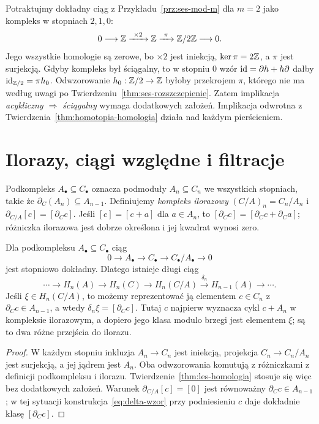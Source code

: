 \begin{przyklad}
\label{prz:acykliczny-niesciagalny}
Potraktujmy dokładny ciąg z
Przykładu~\ref{prz:ses-mod-m} dla $m=2$
jako kompleks w stopniach $2,1,0$:
\[
 0\longrightarrow\Z\xrightarrow{\ \times2\ }\Z
 \xrightarrow{\ \pi\ }\Z/2\Z\longrightarrow0.
\]
Jego wszystkie homologie są zerowe,
bo $\times2$ jest iniekcją,
$\ker\pi=2\mathbb{Z}$, a $\pi$ jest
surjekcją. Gdyby kompleks był
ściągalny, to w stopniu $0$
wzór $\mathrm{id}=\partial h+h\partial$ dałby
$\mathrm{id}_{\mathbb{Z}/2}=\pi h_0$.
Odwzorowanie $h_0:\mathbb{Z}/2\to\mathbb{Z}$ byłoby
przekrojem $\pi$, którego
nie ma według uwagi po
Twierdzeniu~\ref{thm:ses-rozszczepienie}.
Zatem implikacja \emph{acykliczny
$\Rightarrow$ ściągalny} wymaga
dodatkowych założeń. Implikacja
odwrotna z
Twierdzenia~\ref{thm:homotopia-homologia}
działa nad każdym pierścieniem.
\end{przyklad}

\section{Ilorazy, ciągi względne i filtracje}
\label{sec:iloraz-filtracja}

Podkompleks $A_\bullet\subseteq C_\bullet$
oznacza podmoduły $A_n\subseteq C_n$
we wszystkich stopniach, takie że
$\partial_C(A_n)\subseteq A_{n-1}$.
Definiujemy \emph{kompleks ilorazowy}
$(C/A)_n=C_n/A_n$ i
$\partial_{C/A}[c]=[\partial_Cc]$.
Jeśli $[c]=[c+a]$ dla $a\in A_n$,
to $[\partial_Cc]=[\partial_Cc+\partial_Ca]$;
różniczka ilorazowa jest dobrze
określona i jej kwadrat wynosi zero.

\begin{stwierdzenie}
\label{prop:ses-iloraz}
Dla podkompleksu $A_\bullet\subseteq C_\bullet$
ciąg
\[
 0\longrightarrow A_\bullet
 \longrightarrow C_\bullet
 \longrightarrow C_\bullet/A_\bullet
 \longrightarrow0
\]
jest stopniowo dokładny. Dlatego istnieje
długi ciąg
\begin{equation}\label{eq:les-iloraz}
 \cdots\to H_n(A)\to H_n(C)\to H_n(C/A)
 \xrightarrow{\delta_n}H_{n-1}(A)\to\cdots.
\end{equation}
Jeśli $\xi\in H_n(C/A)$, to możemy
reprezentować ją elementem $c\in C_n$
z $\partial_Cc\in A_{n-1}$, a wtedy
$\delta_n\xi=[\partial_Cc]$. Tutaj $c$ najpierw wyznacza cykl
$c+A_n$ w kompleksie ilorazowym, a dopiero jego klasa modulo
brzegi jest elementem $\xi$; są to dwa różne przejścia do ilorazu.
\end{stwierdzenie}
\begin{proof}
W każdym stopniu inkluzja $A_n\to C_n$
jest iniekcją, projekcja $C_n\to C_n/A_n$
jest surjekcją, a jej jądrem jest $A_n$.
Oba odwzorowania komutują z różniczkami
z definicji podkompleksu i ilorazu.
Twierdzenie~\ref{thm:les-homologia}
stosuje się więc bez dodatkowych
założeń. Warunek
$\partial_{C/A}[c]=[0]$ jest równoważny
$\partial_Cc\in A_{n-1}$; w tej sytuacji
konstrukcja~\eqref{eq:delta-wzor}
przy podniesieniu $c$ daje dokładnie
klasę $[\partial_Cc]$.
\end{proof}

